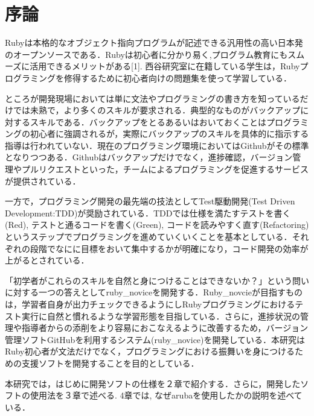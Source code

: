 \section{序論}
Rubyは本格的なオブジェクト指向プログラムが記述できる汎用性の高い日本発のオープンソースである．Rubyは初心者に分かり易く,プログラム教育にもスムーズに活用できるメリットがある[1]. 西谷研究室に在籍している学生は，Rubyプログラミングを修得するために初心者向けの問題集を使って学習している．

ところが開発現場においては単に文法やプログラミングの書き方を知っているだけでは未熟で，より多くのスキルが要求される．典型的なものがバックアップに対するスキルである．バックアップをとるあるいはおいておくことはプログラミングの初心者に強調されるが，実際にバックアップのスキルを具体的に指示する指導は行われていない．現在のプログラミング環境においてはGithubがその標準となりつつある．Githubはバックアップだけでなく，進捗確認，バージョン管理やプルリクエストといった，チームによるプログラミングを促進するサービスが提供されている．

一方で，プログラミング開発の最先端の技法としてTest駆動開発(Test Driven Development:TDD)が奨励されている．TDDでは仕様を満たすテストを書く(Red), テストと通るコードを書く(Green), コードを読みやすく直す(Refactoring)というステップでプログラミングを進めていくいくことを基本としている．それぞれの段階でなにに目標をおいて集中するかが明確になり，コード開発の効率が上がるとされている．

「初学者がこれらのスキルを自然と身につけることはできないか？」という問いに対する一つの答えとしてruby\_noviceを開発する．Ruby\_novcieが目指すものは，学習者自身が出力チェックできるようにしRubyプログラミングにおけるテスト実行に自然と慣れるような学習形態を目指している．さらに，進捗状況の管理や指導者からの添削をより容易におこなえるように改善するため，バージョン管理ソフトGitHubを利用するシステム(ruby\_novice)を開発している．本研究はRuby初心者が文法だけでなく，プログラミングにおける振舞いを身につけるための支援ソフトを開発することを目的としている．

本研究では，はじめに開発ソフトの仕様を２章で紹介する．さらに，開発したソフトの使用法を３章で述べる. 4章では, なぜarubaを使用したかの説明を述べている．

